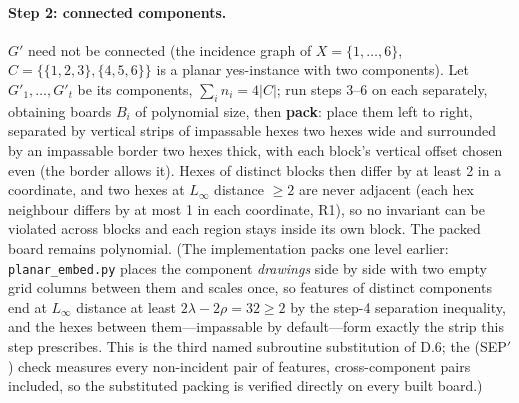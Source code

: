 \documentclass[11pt,a4paper]{article}
\theoremstyle{plain}
\theoremstyle{definition}
\theoremstyle{plain}
\theoremstyle{definition}
\theoremstyle{remark}
\newcommand{\src}[1]{\texttt{#1}}
\begin{document}
\paragraph{Step 2: connected components.} $G'$ need not be connected (the incidence graph of
$X=\{1,\dots,6\}$, $C=\{\{1,2,3\},\{4,5,6\}\}$ is a planar yes-instance with two components).
Let $G'_1,\dots,G'_t$ be its components, $\sum_i n_i=4|C|$; run steps 3--6 on each separately,
obtaining boards $B_i$ of polynomial size, then \textbf{pack}: place them left to right,
separated by vertical strips of impassable hexes two hexes wide and surrounded by an impassable
border two hexes thick, with each block's vertical offset chosen even (the border allows it).
Hexes of distinct blocks then differ by at least 2 in a coordinate, and two hexes at $L_\infty$
distance $\ge 2$ are never adjacent (each hex neighbour differs by at most 1 in each coordinate,
R1), so no invariant can be violated across blocks and each region stays inside its own block.
The packed board remains polynomial. (The implementation packs one level earlier:
\src{planar\_embed.py} places the component \emph{drawings} side by side with two empty grid
columns between them and scales once, so features of distinct components end at $L_\infty$
distance at least $2\lambda-2\rho=32\ge 2$ by the step-4 separation inequality, and the hexes
between them---impassable by default---form exactly the strip this step prescribes. This is the
third named subroutine substitution of D.6; the (SEP$'$) check measures every non-incident pair
of features, cross-component pairs included, so the substituted packing is verified directly on
every built board.)
\end{document}
